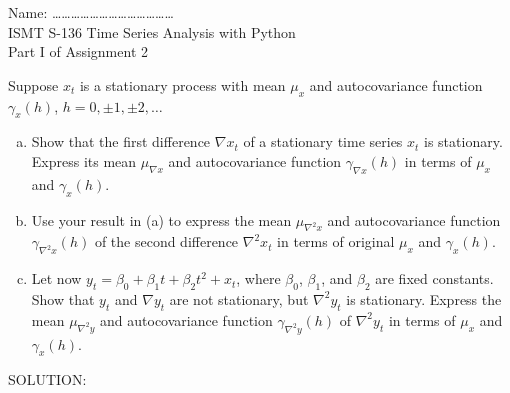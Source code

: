 \documentclass[12pt]{letter}
\begin{document}
\begin{flushleft}
{\sc Name: \ldots\ldots\ldots\ldots\ldots\ldots\ldots\ldots\ldots\ldots\ldots\ldots\ldots}\\
ISMT S-136 Time Series Analysis with Python\\
Part I of Assignment 2\\
\end{flushleft}

Suppose $x_t$ is a stationary process with mean $\mu_x$ and autocovariance function $\gamma_{x}(h)$,  $h=0,\pm 1, \pm 2,\ldots$
\begin{enumerate}[(a)]
\item Show that the first difference $\nabla x_t$ of a stationary time series $x_t$ is stationary. Express its mean $\mu_{\nabla x}$ and autocovariance function $\gamma_{\nabla x}(h)$ in terms of $\mu_x$ and $\gamma_x(h)$. 
\item Use your result in (a) to express the mean $\mu_{\nabla^2 x}$ and autocovariance function $\gamma_{\nabla^2 x}(h)$ of the second difference $\nabla^2 x_t$ in terms of original $\mu_x$ and $\gamma_x(h)$.
\item Let now $y_t=\beta_0+\beta_1 t +\beta_2 t^2+x_t$, where $\beta_0$, $\beta_1$, and $\beta_2$ are fixed constants. Show that $y_t$ and $\nabla y_t$ are not stationary, but $\nabla^2 y_t$ is stationary. Express the mean $\mu_{\nabla^2 y}$ and autocovariance function $\gamma_{\nabla^2 y}(h)$ of $\nabla^2 y_t$ in terms of $\mu_x$ and $\gamma_x(h)$.
\end{enumerate}
SOLUTION:
\end{document}
